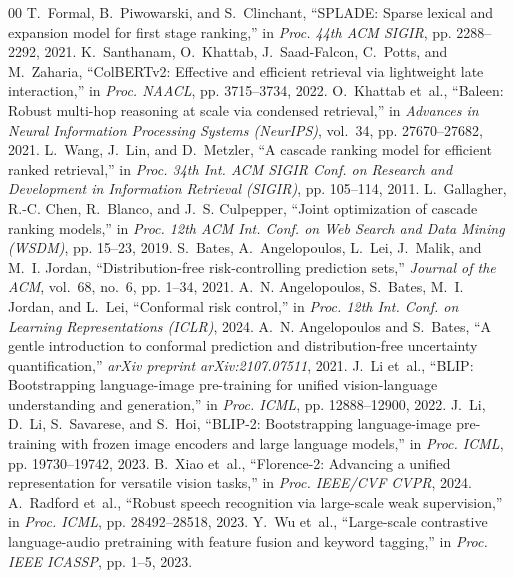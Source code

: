 \begin{thebibliography}{00}
T.~Formal, B.~Piwowarski, and S.~Clinchant, ``SPLADE: Sparse lexical and expansion model for first stage ranking,'' in \emph{Proc. 44th ACM SIGIR}, pp. 2288--2292, 2021.
K.~Santhanam, O.~Khattab, J.~Saad-Falcon, C.~Potts, and M.~Zaharia, ``ColBERTv2: Effective and efficient retrieval via lightweight late interaction,'' in \emph{Proc. NAACL}, pp. 3715--3734, 2022.
O.~Khattab et~al., ``Baleen: Robust multi-hop reasoning at scale via condensed retrieval,'' in \emph{Advances in Neural Information Processing Systems (NeurIPS)}, vol.~34, pp. 27670--27682, 2021.
L.~Wang, J.~Lin, and D.~Metzler, ``A cascade ranking model for efficient ranked retrieval,'' in \emph{Proc. 34th Int. ACM SIGIR Conf. on Research and Development in Information Retrieval (SIGIR)}, pp. 105--114, 2011.
L.~Gallagher, R.-C. Chen, R.~Blanco, and J.~S. Culpepper, ``Joint optimization of cascade ranking models,'' in \emph{Proc. 12th ACM Int. Conf. on Web Search and Data Mining (WSDM)}, pp. 15--23, 2019.
S.~Bates, A.~Angelopoulos, L.~Lei, J.~Malik, and M.~I. Jordan, ``Distribution-free risk-controlling prediction sets,'' \emph{Journal of the ACM}, vol.~68, no.~6, pp. 1--34, 2021.
A.~N. Angelopoulos, S.~Bates, M.~I. Jordan, and L.~Lei, ``Conformal risk control,'' in \emph{Proc. 12th Int. Conf. on Learning Representations (ICLR)}, 2024.
A.~N. Angelopoulos and S.~Bates, ``A gentle introduction to conformal prediction and distribution-free uncertainty quantification,'' \emph{arXiv preprint arXiv:2107.07511}, 2021.
J.~Li et~al., ``BLIP: Bootstrapping language-image pre-training for unified vision-language understanding and generation,'' in \emph{Proc. ICML}, pp. 12888--12900, 2022.
J.~Li, D.~Li, S.~Savarese, and S.~Hoi, ``BLIP-2: Bootstrapping language-image pre-training with frozen image encoders and large language models,'' in \emph{Proc. ICML}, pp. 19730--19742, 2023.
B.~Xiao et~al., ``Florence-2: Advancing a unified representation for versatile vision tasks,'' in \emph{Proc. IEEE/CVF CVPR}, 2024.
A.~Radford et~al., ``Robust speech recognition via large-scale weak supervision,'' in \emph{Proc. ICML}, pp. 28492--28518, 2023.
Y.~Wu et~al., ``Large-scale contrastive language-audio pretraining with feature fusion and keyword tagging,'' in \emph{Proc. IEEE ICASSP}, pp. 1--5, 2023.

\end{thebibliography}
